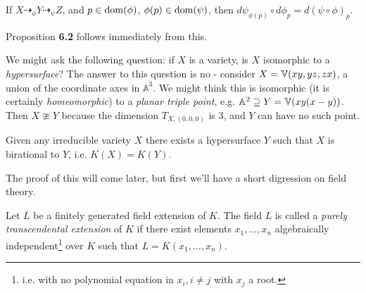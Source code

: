 \documentclass[10pt,a4paper,rgb]{article}
\newcommand{\A}{\mathbb{A}}
\begin{document}
If $X \dashrightarrow_\phi Y \dashrightarrow_\psi Z$, and $p \in \operatorname{dom}(\phi)$, $\phi(p) \in \operatorname{dom}(\psi)$, then $d\psi_{\phi(p)}\circ d\phi_p = d(\psi \circ \phi)_p$.

Proposition \textbf{6.2} follows immediately from this.

We might ask the following question: if $X$ is a variety, is $X$ isomorphic to a \emph{hypersurface}? The answer to this question is no - consider $X = \mathbb{V}(xy,yz,zx)$, a union of the coordinate axes in $\A^3$. We might think this is isomorphic (it is certainly \textit{homeomorphic}) to a \emph{planar triple point}, e.g. $\A^2 \supseteq Y = \V(xy(x-y))$. Then $X \ncong Y$ because the dimension $T_{X,(0,0,0)}$ is 3, and $Y$ can have no such point.

\begin{theorem}
Given any irreducible variety $X$ there exists a hypersurface $Y$ such that $X$ is birational to $Y$, i.e. $K(X) = K(Y)$.
\end{theorem}
The proof of this will come later, but first we'll have a short digression on field theory.

Let $L$ be a finitely generated field extension of $K$. The field $L$ is called a \emph{purely transcendental extension} of $K$ if there exist elements $x_1, \ldots, x_n$ algebraically independent\footnote{i.e. with no polynomial equation in $x_i, i \neq j$ with $x_j$ a root.} over $K$ such that $L = K(x_1, \ldots, x_n)$.
\end{document}
